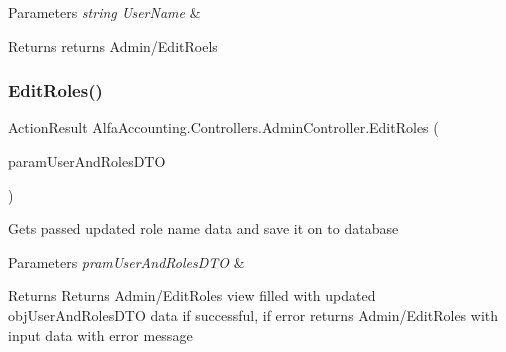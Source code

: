 \begin{DoxyParams}{Parameters}
{\em string User\+Name} & \\
\hline
\end{DoxyParams}
\begin{DoxyReturn}{Returns}
returns Admin/\+Edit\+Roels
\end{DoxyReturn}
\mbox{\label{class_alfa_accounting_1_1_controllers_1_1_admin_controller_a47736fcfb27b8c74c6e19efbcf3752f0}} 
\subsubsection{\texorpdfstring{Edit\+Roles()}{EditRoles()}\hspace{0.1cm}{\footnotesize\ttfamily [2/2]}}
{\footnotesize\ttfamily Action\+Result Alfa\+Accounting.\+Controllers.\+Admin\+Controller.\+Edit\+Roles (\begin{DoxyParamCaption}\item[{User\+And\+Roles\+D\+TO}]{param\+User\+And\+Roles\+D\+TO }\end{DoxyParamCaption})}



Gets passed updated role name data and save it on to database 


\begin{DoxyParams}{Parameters}
{\em pram\+User\+And\+Roles\+D\+TO} & \\
\hline
\end{DoxyParams}
\begin{DoxyReturn}{Returns}
Returns Admin/\+Edit\+Roles view filled with updated obj\+User\+And\+Roles\+D\+TO data if successful, if error returns Admin/\+Edit\+Roles with input data with error message
\end{DoxyReturn}
\mbox{\label{class_alfa_accounting_1_1_controllers_1_1_admin_controller_a1780b7c4be2391ed0d5cbc266851bfe8}} 

